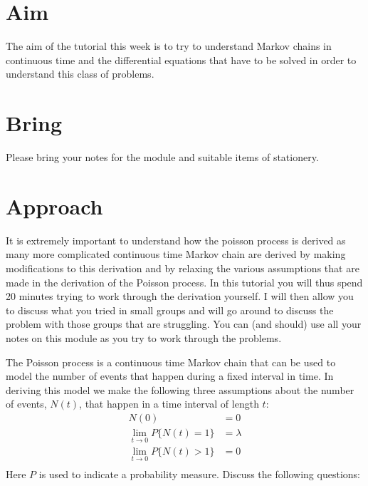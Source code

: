 \documentclass[a4paper]{article}
\begin{document}
\section{Aim}

The aim of the tutorial this week is to try to understand Markov chains in continuous time and the differential equations that have to be solved in order to understand this class of problems.

\section{Bring}

Please bring your notes for the module and suitable items of stationery.

\section{Approach}

It is extremely important to understand how the poisson process is derived as many more complicated continuous time Markov chain are derived by making modifications to this derivation and by relaxing 
the various assumptions that are made in the derivation of the Poisson process.  In this tutorial you will thus spend 20 minutes trying to work through the derivation yourself.  I will then allow you 
to discuss what you tried in small groups and will go around to discuss the problem with those groups that are struggling.  You can (and should) use all your notes on this module as you try to work 
through the problems.

The Poisson process is a continuous time Markov chain that can be used to model the number of events that happen during a fixed interval in time.  In deriving this model we make the following three 
assumptions about the number of events, $N(t)$, that happen in a time interval of length $t$:
$$
\begin{aligned}
 N(0) & = 0 \\
 \lim_{t \rightarrow 0} P\{ N(t)=1 \} & = \lambda \\
 \lim_{t \rightarrow 0} P\{ N(t)>1 \} & = 0 \\
\end{aligned}
$$
Here $P$ is used to indicate a probability measure.  Discuss the following questions:
\end{document}
